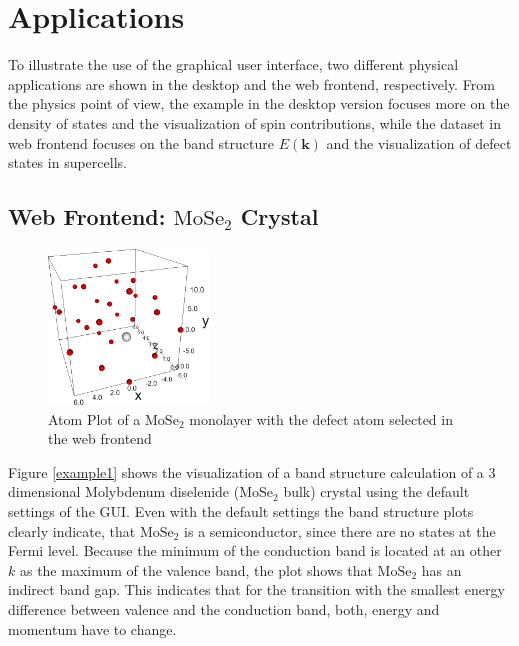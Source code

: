 \chapter{Applications}
\label{chap:applications}


To illustrate the use of the graphical user interface, two different physical
applications are shown in the desktop and the web frontend, respectively. From
the physics point of view, the example in the desktop version focuses more on the
density of states and the visualization of spin contributions, while the dataset
in web frontend focuses on the band structure $E(\mathbf{k})$ and the visualization
of defect states in supercells.

\section{Web Frontend: $\textrm{MoSe}_2$ Crystal}

\begin{figure} %
    \centering
    \includegraphics[width=0.38\textwidth]{img/gui_web_mose2_monolayer_atomplot.png}
    \caption[Atom Plot of a $\textrm{MoSe}_2$ monolayer]{Atom Plot of a $\textrm{MoSe}_2$ monolayer with the defect atom selected in
      the web frontend}
    \label{fig:modules}
\end{figure}

Figure \ref{example1} shows the visualization of a band structure calculation of a 3 dimensional Molybdenum diselenide ($\textrm{MoSe}_2$ bulk) crystal using the default settings of the GUI. Even with the default settings the band structure plots clearly indicate, that $\textrm{MoSe}_2$ is a semiconductor, since there are no states at the Fermi level. Because the minimum of the conduction band is located at an other $k$ as the maximum of the valence band, the plot shows that $\textrm{MoSe}_2$ has an indirect band gap. This indicates that for the transition with the smallest energy difference between valence and the conduction band, both, energy and momentum have to change.

